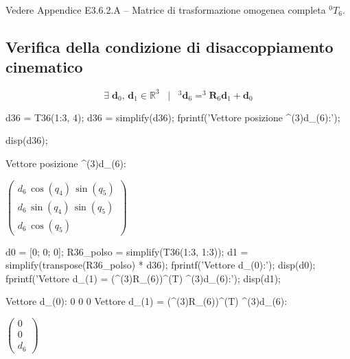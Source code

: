 \documentclass[11pt, a4paper]{article}
\begin{document}
\begin{par}
\begin{flushleft}
Vedere Appendice E3.6.2.A -- Matrice di trasformazione omogenea completa ${}^{0}T_{6}$.
\end{flushleft}
\end{par}

\subsection*{Verifica della condizione di disaccoppiamento cinematico}

\begin{par}
$$\exists \;{\mathbf{d}}_0 ,\,{\mathbf{d}}_1 \in {\mathbb{R}}^3 \;\;\mid \;\;^3 {\mathbf{d}}_6 =^3 {\mathbf{R}}_6 {\mathbf{d}}_1 +{\mathbf{d}}_0$$
\end{par}

\begin{matlabcode}
d36 = T36(1:3, 4);
d36 = simplify(d36);
fprintf('Vettore posizione ^(3)d_(6):\n');

disp(d36);
\end{matlabcode}
\begin{matlaboutput}
Vettore posizione ^(3)d_(6):
\end{matlaboutput}

\begin{matlabsymbolicoutput}
$\displaystyle \left(\begin{array}{c}
d_6 \,\cos \left(q_4 \right)\,\sin \left(q_5 \right)\\
d_6 \,\sin \left(q_4 \right)\,\sin \left(q_5 \right)\\
d_6 \,\cos \left(q_5 \right)
\end{array}\right)$
\end{matlabsymbolicoutput}
\newpage
\begin{matlabcode}
d0 = [0; 0; 0];
R36_polso = simplify(T36(1:3, 1:3));
d1 = simplify(transpose(R36_polso) * d36);
fprintf('Vettore d_(0):\n');
disp(d0);
fprintf('Vettore d_(1) = (^(3)R_(6))^(T) ^(3)d_(6):\n');
disp(d1);
\end{matlabcode}
\begin{matlaboutput}
Vettore d_(0):
     0
     0
     0
Vettore d_(1) = (^(3)R_(6))^(T) ^(3)d_(6):
\end{matlaboutput}
\begin{matlabsymbolicoutput}
$\displaystyle
    \begin{pmatrix}
        0\\
        0\\
        d_{6}
    \end{pmatrix}
$
\end{matlabsymbolicoutput}
\end{document}
